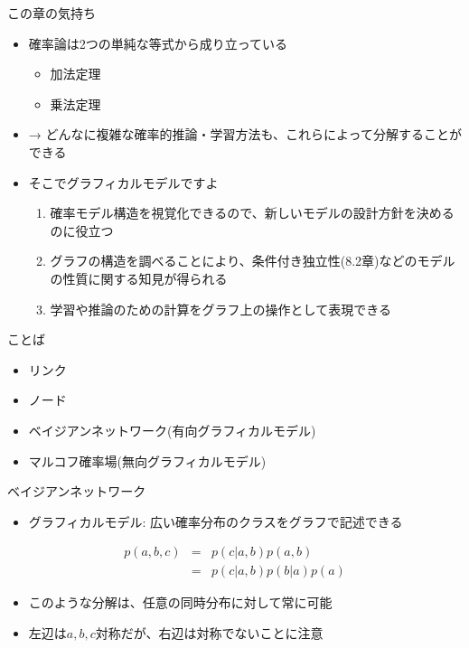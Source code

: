 \begin{frame}{この章の気持ち}
 \begin{itemize}
  \item 確率論は2つの単純な等式から成り立っている
        \begin{itemize}
         \item 加法定理
         \item 乗法定理
        \end{itemize}
  \item → どんなに複雑な確率的推論・学習方法も、これらによって分解することができる
  \item そこでグラフィカルモデルですよ
        \begin{enumerate}
         \item 確率モデル構造を視覚化できるので、新しいモデルの設計方針を決めるのに役立つ
         \item グラフの構造を調べることにより、条件付き独立性(8.2章)などのモデルの性質に関する知見が得られる
         \item 学習や推論のための計算をグラフ上の操作として表現できる
        \end{enumerate}
 \end{itemize}
\end{frame}

\begin{frame}{ことば}
 \begin{itemize}
  \item リンク
  \item ノード
  \item ベイジアンネットワーク(有向グラフィカルモデル)
  \item マルコフ確率場(無向グラフィカルモデル)
 \end{itemize}
\end{frame}

\begin{frame}{ベイジアンネットワーク}
 \begin{itemize}
  \item グラフィカルモデル: 広い確率分布のクラスをグラフで記述できる
 \end{itemize}
 \begin{eqnarray*}
  p(a,b,c) &=& p(c|a,b)p(a,b) \\
  & =& p(c|a,b)p(b|a)p(a)
 \end{eqnarray*}
 \begin{itemize}
  \item このような分解は、任意の同時分布に対して常に可能
  \item 左辺は$a,b,c$対称だが、右辺は対称でないことに注意
 \end{itemize}
\end{frame}

